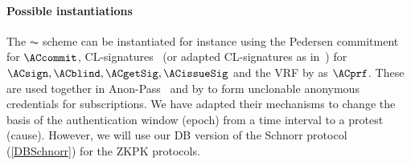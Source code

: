 \paragraph*{Possible instantiations}
The \(\AC\) scheme can be instantiated for instance using the Pedersen commitment~\cite{PedersenCommitment} for \(\ACcommit\), CL-signatures~\cite{CLsignatures} (or adapted CL-signatures as in~\cite{AnonPass}) for \(\ACsign, \ACblind, \ACgetSig, \ACissueSig\) and the \ac{VRF} by \citet{DY-VRF} as \(\ACprf\).
These are used together in Anon-Pass~\cite{AnonPass} and by \textcite{HowToWinTheCloneWars} to form unclonable anonymous credentials for subscriptions.
We have adapted their mechanisms to change the basis of the authentication window (\ie epoch) from a time interval to a protest (\ie cause).
However, we will use our \ac{DB} version of the Schnorr protocol (\cref{DBSchnorr}) for the \ac{ZKPK} protocols.
